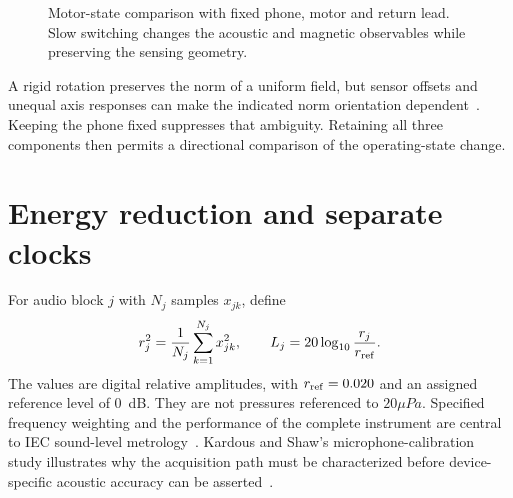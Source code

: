 \begin{figure}[!b]
\centering
{}
\caption{Motor-state comparison with fixed phone, motor and return lead. Slow switching changes the acoustic and magnetic observables while preserving the sensing geometry.}
\label{fig:audio-magnetic-apparatus}
\end{figure}

A rigid rotation preserves the norm of a uniform field, but sensor offsets and unequal axis responses can make the indicated norm orientation dependent~\cite{kok2016}. Keeping the phone fixed suppresses that ambiguity. Retaining all three components then permits a directional comparison of the operating-state change.

\section{Energy reduction and separate clocks}
For audio block $j$ with $N_j$ samples $x_{jk}$, define
\begin{equation}
 r_j^2=\frac{1}{N_j}\sum_{k=1}^{N_j}x_{jk}^2,
 \qquad L_j=20\log_{10}\frac{r_j}{r_{\rm ref}}.
 \label{eq:audio-magnetic-rms}
\end{equation}
The values are digital relative amplitudes, with $r_{\rm ref}=0.020$ and an assigned reference level of 0~dB. They are not pressures referenced to $20\unit{\mu Pa}$. Specified frequency weighting and the performance of the complete instrument are central to IEC sound-level metrology~\cite{iec61672}. Kardous and Shaw's microphone-calibration study illustrates why the acquisition path must be characterized before device-specific acoustic accuracy can be asserted~\cite{kardous2016}.

